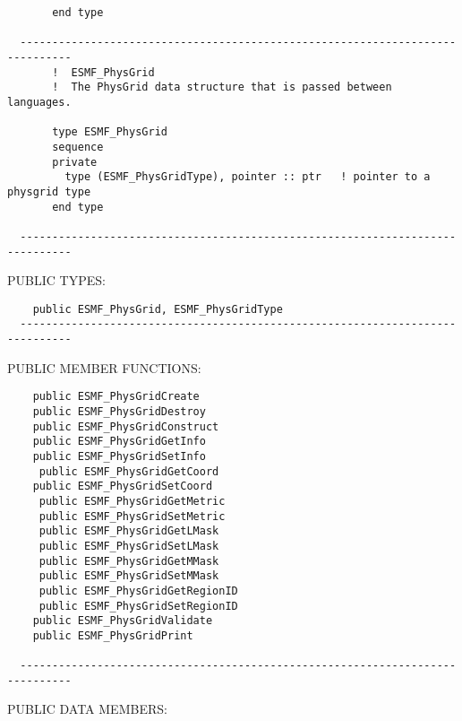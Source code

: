 \begin{verbatim}
       end type
 
  ------------------------------------------------------------------------------
       !  ESMF_PhysGrid
       !  The PhysGrid data structure that is passed between languages.
 
       type ESMF_PhysGrid
       sequence
       private
         type (ESMF_PhysGridType), pointer :: ptr   ! pointer to a physgrid type
       end type
 
  ------------------------------------------------------------------------------\end{verbatim}{\sf PUBLIC TYPES:}
\begin{verbatim}    public ESMF_PhysGrid, ESMF_PhysGridType
  ------------------------------------------------------------------------------\end{verbatim}{\sf PUBLIC MEMBER FUNCTIONS:}
\begin{verbatim}    public ESMF_PhysGridCreate
    public ESMF_PhysGridDestroy
    public ESMF_PhysGridConstruct
    public ESMF_PhysGridGetInfo
    public ESMF_PhysGridSetInfo
     public ESMF_PhysGridGetCoord
    public ESMF_PhysGridSetCoord
     public ESMF_PhysGridGetMetric
     public ESMF_PhysGridSetMetric
     public ESMF_PhysGridGetLMask
     public ESMF_PhysGridSetLMask
     public ESMF_PhysGridGetMMask
     public ESMF_PhysGridSetMMask
     public ESMF_PhysGridGetRegionID
     public ESMF_PhysGridSetRegionID
    public ESMF_PhysGridValidate
    public ESMF_PhysGridPrint
  
  ------------------------------------------------------------------------------\end{verbatim}{\sf PUBLIC DATA MEMBERS:}
